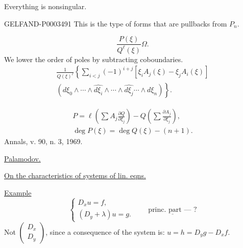 Everything is nonsingular.

\begin{GelfandAdjacentEvidence}{GELFAND-P000349}{1}
This is the type of forms that are pullbacks from $P_n$.
\end{GelfandAdjacentEvidence}

\begin{equation*}\frac{P (\xi)}{Q^\ell (\xi)}\Omega.\end{equation*}
We lower the order of poles by subtracting coboundaries.
\begin{multline*}\frac1{Q (\xi)^\ell}\left\{\sum_{i<j}(-1)^{i+j}[\xi_i A_j (\xi)-\xi_j A_i (\xi)]\right.\\
\left. (d\xi_0\wedge\cdots\wedge\widehat{d\xi_i}\wedge\cdots\wedge\widehat{d\xi_j}\cdots\wedge d\xi_n)\right\}.
\end{multline*}



\begin{gather*}P=\ell\left (\sum A_j\frac{\partial Q}{\partial\xi_j}\right)-Q\left (\sum\frac{\partial A_j}{\partial\xi_j}\right),\\
\deg P (\xi)=\deg Q (\xi)-(n+1).\end{gather*}
Annals, v. 90, n. 3, 1969.

\uline{Palamodov.}

\uline{On the characteristics of systems of lin. eqns.}
\begin{center}\end{center}

\uline{Example}
\begin{equation*}\begin{cases}D_xu=f,\\(D_y+\lambda) u=g.\end{cases}\qquad\underline{\text{princ. part --- ?}}\end{equation*}
Not $\begin{pmatrix}D_x\\D_y\end{pmatrix}$, since a consequence of the system is:
$u=h=D_yg-D_xf$.


